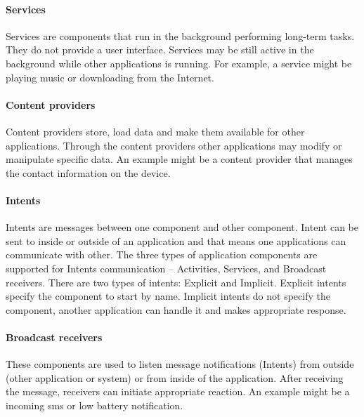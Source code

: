 \paragraph{Services}
Services are components that run in the background performing long-term tasks. They do not provide a user interface. Services may be still active in the background while other applications is running. For example, a service might be playing music or downloading from the Internet.

\paragraph{Content providers}
Content providers store, load data and make them available for other applications. Through the content providers other applications may modify or manipulate specific data. An example might be a content provider that manages the contact information on the device.

\paragraph{Intents}
Intents are messages between one component and other component. Intent can be sent to inside or outside of an application and that means one applications can communicate with other. The three types of application components are supported for Intents communication -- Activities, Services, and Broadcast receivers. There are two types of intents: Explicit and Implicit. Explicit intents specify the component to start by name. Implicit intents do not specify the component, another application can handle it and makes appropriate response.

\paragraph{Broadcast receivers}
These components are used to listen message notifications (Intents) from outside (other application or system) or from inside of the application. After receiving the message, receivers can initiate appropriate reaction. An example might be a incoming sms or low battery notification.

